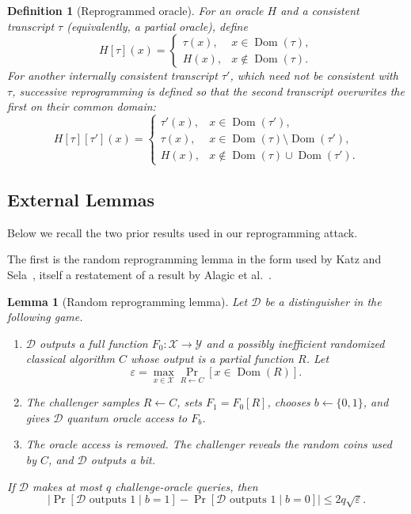 \documentclass[11pt]{article}
\newcounter{algorithm}
\newtheorem{lemma}[lemma]{Lemma}
\newtheorem{definition}[definition]{Definition}
\newcommand{\bits}{\{0,1\}}
\newcommand{\cD}{\mathcal{D}}
\newcommand{\cX}{\mathcal{X}}
\newcommand{\cY}{\mathcal{Y}}
\newcommand{\Dom}{\operatorname{Dom}}
\begin{document}
\begin{definition}[Reprogrammed oracle]
For an oracle \(H\) and a consistent transcript \(\tau\) (equivalently, a
partial oracle), define
\[
  H[\tau](x)
  =
  \begin{cases}
    \tau(x),&x\in\Dom(\tau),\\
    H(x),&x\notin\Dom(\tau).
  \end{cases}
\]
For another internally consistent transcript \(\tau'\), which need not be
consistent with \(\tau\), successive reprogramming is
defined so that the second transcript overwrites the first on their common
domain:
\[
  H[\tau][\tau'](x)
  =
  \begin{cases}
    \tau'(x),&x\in\Dom(\tau'),\\
    \tau(x),&x\in\Dom(\tau)\setminus\Dom(\tau'),\\
    H(x),&x\notin\Dom(\tau)\cup\Dom(\tau').
  \end{cases}
\]
\end{definition}


\subsection{External Lemmas}

Below we recall the two prior results used in our reprogramming attack.

The first is the random reprogramming
lemma in the form used by Katz and Sela~\cite[Lemma~3]{KatzSela24}, itself a
restatement of a result by Alagic et al.~\cite[Lemma~3]{AlagicEtAl22}.

\begin{lemma}[Random reprogramming lemma]\label{lem:reprogramming}
Let \(\cD\) be a distinguisher in the following game.
\begin{enumerate}[leftmargin=2em]
  \item \(\cD\) outputs a full function
  \(F_0:\cX\to\cY\) and a possibly inefficient randomized classical
  algorithm \(C\) whose output is a
  partial function \(R\).  Let
  \[
    \varepsilon
    =
    \max_{x\in\cX}
    \Pr_{R\leftarrow C}[x\in\Dom(R)].
  \]
  \item The challenger samples \(R\leftarrow C\), sets
  \(F_1=F_0[R]\), chooses \(b\leftarrow\bits\), and gives \(\cD\) quantum
  oracle access to \(F_b\).
  \item The oracle access is removed.  The challenger reveals the random
  coins used by \(C\), and \(\cD\) outputs a bit.
\end{enumerate}
If \(\cD\) makes at most \(q\) challenge-oracle queries, then
\[
  \left|
    \Pr[\cD\text{ outputs }1\mid b=1]
    -
    \Pr[\cD\text{ outputs }1\mid b=0]
  \right|
  \le 2q\sqrt\varepsilon.
\]
\end{lemma}
\end{document}
